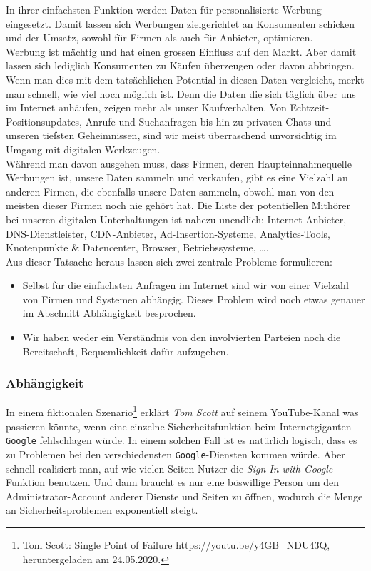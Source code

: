 \documentclass[11pt]{article}
\begin{document}
\noindent In ihrer einfachsten Funktion werden Daten für
personalisierte Werbung eingesetzt. Damit lassen sich Werbungen
zielgerichtet an Konsumenten schicken und der Umsatz, sowohl für
Firmen als auch für Anbieter, optimieren.\\

\noindent Werbung ist mächtig und hat einen grossen Einfluss auf den
Markt. Aber damit lassen sich lediglich Konsumenten zu Käufen
überzeugen oder davon abbringen. Wenn man dies mit dem tatsächlichen
Potential in diesen Daten vergleicht, merkt man schnell, wie viel noch
möglich ist. Denn die Daten die sich täglich über uns im Internet
anhäufen, zeigen mehr als unser Kaufverhalten. Von
Echtzeit-Positionsupdates, Anrufe und Suchanfragen bis hin zu privaten
Chats und unseren tiefsten Geheimnissen, sind wir meist überraschend
unvorsichtig im Umgang mit digitalen Werkzeugen.\\

\noindent Während man davon ausgehen muss, dass Firmen, deren
Haupteinnahmequelle Werbungen ist, unsere Daten sammeln und verkaufen,
gibt es eine Vielzahl an anderen Firmen, die ebenfalls unsere Daten
sammeln, obwohl man von den meisten dieser Firmen noch nie gehört hat.
Die Liste der potentiellen Mithörer bei unseren digitalen
Unterhaltungen ist nahezu unendlich: Internet-Anbieter,
DNS-Dienstleister, CDN-Anbieter, Ad-Insertion-Systeme,
Analytics-Tools, Knotenpunkte \& Datencenter, Browser, Betriebssysteme,
\ldots{}.\\

\noindent Aus dieser Tatsache heraus lassen sich zwei zentrale
Probleme formulieren:
\begin{itemize}
\item Selbst für die einfachsten Anfragen im Internet sind wir von einer
Vielzahl von Firmen und Systemen abhängig. Dieses Problem wird noch
etwas genauer im Abschnitt \hyperref[sec:orgb86f7f7]{Abhängigkeit} besprochen.
\item Wir haben weder ein Verständnis von den involvierten Parteien noch
die Bereitschaft, Bequemlichkeit dafür aufzugeben.
\end{itemize}
\subsubsection{Abhängigkeit}
\label{sec:orgb86f7f7}
In einem fiktionalen Szenario\footnote{Tom Scott: Single Point of Failure
\url{https://youtu.be/y4GB\_NDU43Q}, heruntergeladen am 24.05.2020.} erklärt \emph{Tom Scott} auf seinem
YouTube-Kanal was passieren könnte, wenn eine einzelne
Sicherheitsfunktion beim Internetgiganten \texttt{Google} fehlschlagen würde.
In einem solchen Fall ist es natürlich logisch, dass es zu Problemen
bei den verschiedensten \texttt{Google}-Diensten kommen würde. Aber schnell
realisiert man, auf wie vielen Seiten Nutzer die \emph{Sign-In with Google}
Funktion benutzen. Und dann braucht es nur eine böswillige Person um
den Administrator-Account anderer Dienste und Seiten zu öffnen,
wodurch die Menge an Sicherheitsproblemen exponentiell steigt.\\
\end{document}

